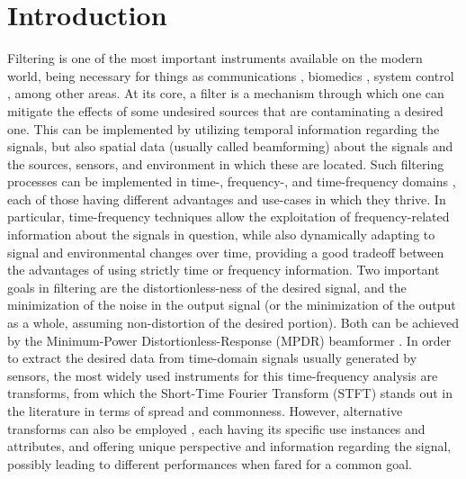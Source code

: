\section{Introduction}
\label{sec:introduction}

Filtering is one of the most important instruments available on the modern world, being necessary for things as communications \cite{chen_source_2002}, biomedics \cite{lobato_worst-case-optimization_2020,lu_biomedical_1994,nguyen_minimum_2017}, system control \cite{han_comparative_2016, hagglund_signal_2012}, among other areas. At its core, a filter is a mechanism through which one can mitigate the effects of some undesired sources that are contaminating a desired one. This can be implemented by utilizing temporal information regarding the signals, but also spatial data (usually called beamforming) about the signals and the sources, sensors, and environment in which these are located. Such filtering processes can be implemented in time-, frequency-, and time-frequency domains \cite{benesty_fundamentals_2017}, each of those having different advantages and use-cases in which they thrive. In particular, time-frequency techniques allow the exploitation of frequency-related information about the signals in question, while also dynamically adapting to signal and environmental changes over time, providing a good tradeoff between the advantages of using strictly time or frequency information. Two important goals in filtering are the distortionless-ness of the desired signal, and the minimization of the noise in the output signal (or the minimization of the output as a whole, assuming non-distortion of the desired portion). Both can be achieved by the Minimum-Power Distortionless-Response (MPDR) beamformer \cite{capon_high-resolution_1969,erdogan_improved_2016}. In order to extract the desired data from time-domain signals usually generated by sensors, the most widely used instruments for this time-frequency analysis are transforms, from which the Short-Time Fourier Transform (STFT) \cite{kiymik_comparison_2005,pan_microphone_2021} stands out in the literature in terms of spread and commonness. However, alternative transforms can also be employed \cite{chen_wavelet-based_2018,yang_general_2014,almeida_fractional_1994}, each having its specific use instances and attributes, and offering unique perspective and information regarding the signal, possibly leading to different performances when fared for a common goal.

